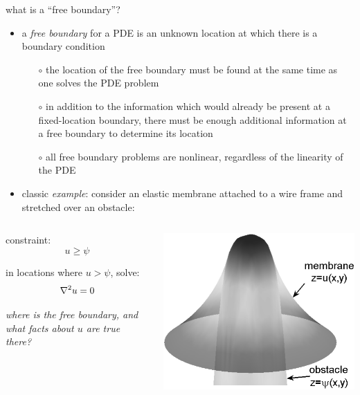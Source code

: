 \begin{frame}{what is a ``free boundary''?}

\begin{itemize}
\item a \emph{free boundary} for a PDE is an unknown location at which there is a boundary condition
  \begin{itemize}
  \item[$\circ$] the location of the free boundary must be found at the same time as one solves the PDE problem
  \item[$\circ$] in addition to the information which would already be present at a fixed-location boundary, there must be enough additional information at a free boundary to determine its location
  \item[$\circ$] all free boundary problems are nonlinear, regardless of the linearity of the PDE
  \end{itemize}
\item classic \emph{example}:  consider an elastic membrane attached to a wire frame and stretched over an obstacle:
\end{itemize}

\begin{columns}
\begin{column}{0.5\textwidth}
\small
constraint:
  $$u \ge \psi$$

in locations where $u>\psi$, solve:
  $$\nabla^2 u = 0$$
  
\emph{where is the free boundary, and what facts about $u$ are true there?}
\end{column}
\begin{column}{0.5\textwidth}
  \includegraphics[width=1.0\textwidth]{photos/classicalobs}
\end{column}
\end{columns}
\end{frame}


